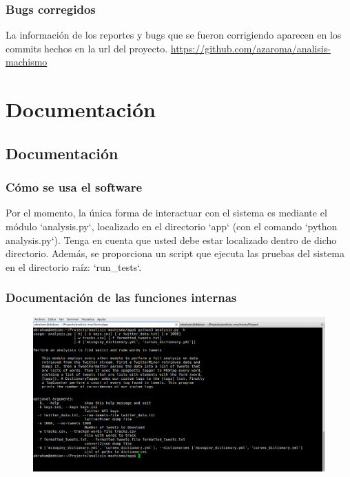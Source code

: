 \documentclass[oneside]{book}
\begin{document}
\subsection{Bugs corregidos}
La información de los reportes y bugs que se fueron corrigiendo aparecen en los commits hechos en la url del proyecto.
\url{https://github.com/azaroma/analisis-machismo} 

\chapter{Documentación}
\section{Documentación}
\subsection{Cómo se usa el software}
Por el momento, la única forma de interactuar con el sistema es mediante el
módulo `analysis.py`, localizado en el directorio `app` (con el comando
`python analysis.py`). Tenga en cuenta que usted debe estar localizado dentro
de dicho directorio. Además, se proporciona un script que ejecuta las pruebas
del sistema en el directorio raíz: `run\_tests`.

\subsection{Documentación de las funciones internas}
\begin{figure}[H]
\includegraphics[scale=0.35]{help.png}
\end{figure}













\end{document}
